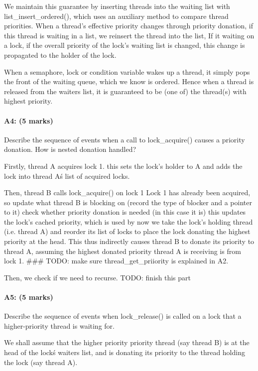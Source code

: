 We maintain this guarantee by inserting threads into the waiting list with list\_insert\_ordered(), which uses an auxiliary method to compare thread priorities.
When a thread's effective priority changes through priority donation, if this thread is waiting in a list, we reinsert the thread into the list, If it waiting on a lock, if the overall priority of the lock's waiting list is changed, this change is propagated to the holder of the lock.

When a semaphore, lock or condition variable wakes up a thread, it simply pops the front of the waiting queue, which we know is ordered. Hence when a thread is released from the waiters list, it is guaranteed to be (one of) the thread(s) with highest priority.


\paragraph{A4: (5 marks)}
Describe the sequence of events when a call to lock\_acquire() causes a priority donation.  How is nested donation handled?

  Firstly, thread A acquires lock 1.
    this sets the lock's holder to A and adds the lock into thread A\'s list of acquired locks.

  Then, thread B calls lock\_acquire() on lock 1
  Lock 1 has already been acquired, so
    update what thread B is blocking on (record the type of blocker and a pointer to it)
    check whether priority donation is needed (in this case it is)
      this updates the lock's cached priority, which is used by 
    now we take the lock's holding thread (i.e. thread A) and reorder its list of locks to place the lock donating the highest priority at the head. This thus indirectly causes thread B to donate its priority to thread A, assuming the highest donated priority thread A is receiving is from lock 1.
    \#\#\# TODO: make sure thread\_get\_priiority is explained in A2.

    Then, we check if we need to recurse. TODO: finish this part

\paragraph{A5: (5 marks)}
Describe the sequence of events when lock\_release() is called on a lock that a higher-priority thread is waiting for.

We shall assume that the higher priority priority thread (say thread B) is at the head of the lock\'s waiters list, and is donating its priority to the thread holding the lock (say thread A).

